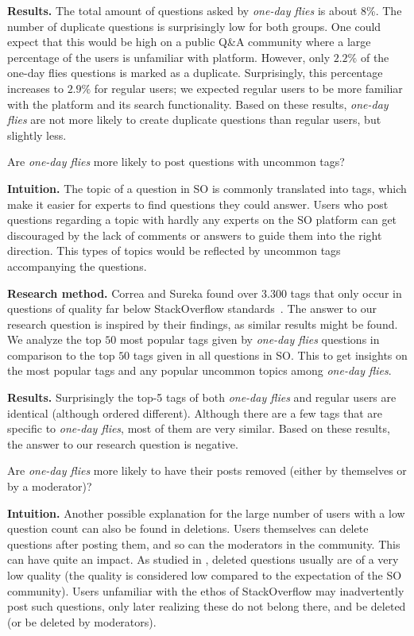 \documentclass[conference]{IEEEtran}
\newcommand\odf{\emph{one-day flies}\xspace}
\newcommand\ru{regular users\xspace}
\begin{document}
\textbf{Results.} The total amount of questions asked by \odf is about 8\%. The
number of duplicate questions is surprisingly low for both groups. One could
expect that this would be high on a public Q\&A community where a large
percentage of the users is unfamiliar with platform. However, only $2.2\%$ of
the one-day flies questions is marked as a duplicate. Surprisingly, this
percentage increases to $2.9\%$ for \ru; we expected \ru to be more familiar
with the platform and its search functionality. Based on these results, \odf
are not more likely to create duplicate questions than \ru, but
slightly less.\\


\begin{tcolorbox}[size=fbox,title=RQ2: Uncommon Tags]
Are \odf more likely to post questions with uncommon tags?
\end{tcolorbox}

\textbf{Intuition.} The topic of a question in SO is commonly translated into
tags, which make it easier for experts to find questions they could answer.
Users who post questions regarding a topic with hardly any experts on the SO
platform can get discouraged by the lack of comments or answers to guide them
into the right direction. This types of topics would be reflected by uncommon
tags accompanying the questions. 
 
\textbf{Research method.} Correa and Sureka found over $3.300$ tags that only
occur in questions of quality far below StackOverflow
standards~\cite{correa2014chaff}. The answer to our research question is
inspired by their findings, as similar results might be found. We analyze the
top $50$ most popular tags given by \odf questions in comparison to the top
$50$ tags given in all questions in SO. This to get insights on the
most popular tags and any popular uncommon topics among \odf.

\textbf{Results.} Surprisingly the top-5 tags of both \odf and \ru
are identical (although ordered different). Although there are a few tags that
are specific to \odf, most of them are very similar. Based on these results, the
answer to our research question is negative.

\begin{tcolorbox}[size=fbox,title=RQ3: Deleted Questions]
Are \odf more likely to have their posts removed (either by
themselves or by a moderator)?
\end{tcolorbox}

\textbf{Intuition.} Another possible explanation for the large number of users
with a low question count can also be found in deletions. Users themselves can
delete questions after posting them, and so can the moderators in the
community. This can have quite an impact. As studied in \cite{correa2014chaff},
deleted questions usually are of a very low quality (the quality is considered
low compared to the expectation of the SO community). Users unfamiliar with the
ethos of StackOverflow may inadvertently post such questions, only later
realizing these do not belong there, and be deleted (or be deleted by
moderators). 
\end{document}
